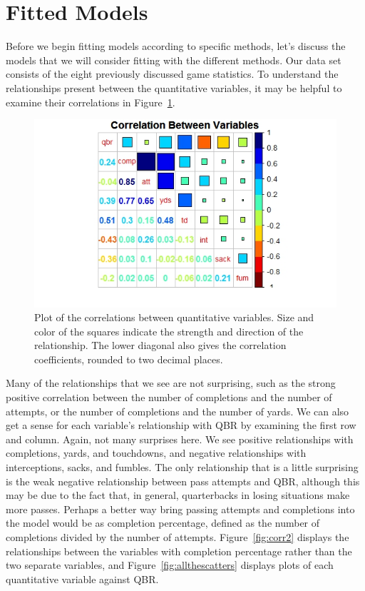 \documentclass[12pt]{article}\usepackage[]{graphicx}\usepackage[]{color}
\begin{document}
\section{Fitted Models}
Before we begin fitting models according to specific methods, let's discuss the models that we will consider fitting with the different methods. Our data set consists of the eight previously discussed game statistics. To understand the relationships present between the quantitative variables, it may be helpful to examine their correlations in Figure~\ref{fig:corr}.

\begin{figure}[h]
\centering
\includegraphics[width=1.2\textwidth]{correlation.jpeg}
\captionsetup{font=footnotesize,labelfont=footnotesize}
\caption{\label{fig:corr} Plot of the correlations between quantitative variables. Size and color of the squares indicate the strength and direction of the relationship. The lower diagonal also gives the correlation coefficients, rounded to two decimal places.}
\end{figure}

Many of the relationships that we see are not surprising, such as the strong positive correlation between the number of completions and the number of attempts, or the number of completions and the number of yards. We can also get a sense for each variable's relationship with QBR by examining the first row and column. Again, not many surprises here. We see positive relationships with completions, yards, and touchdowns, and negative relationships with interceptions, sacks, and fumbles. The only relationship that is a little surprising is the weak negative relationship between pass attempts and QBR, although this may be due to the fact that, in general, quarterbacks in losing situations make more passes. Perhaps a better way bring passing attempts and completions into the model would be as completion percentage, defined as the number of completions divided by the number of attempts. Figure~\ref{fig:corr2} displays the relationships between the variables with completion percentage rather than the two separate variables, and Figure~\ref{fig:allthescatters} displays plots of each quantitative variable against QBR.
\end{document}

